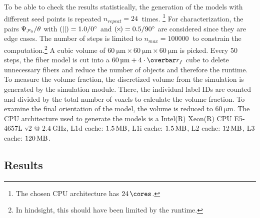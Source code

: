 %
To be able to check the results statistically, the generation of the models with different seed points is repeated  $n_{\mathit{repeat}} = \SI{24}{}$ times. \footnote{The chosen \ac{CPU} architecture has $\SI{24}{\cores}$.}
For characterization, the pairs $\textnormal{$\Psi_{\textnormal{$\mathcal{F}_0$}}$}/\textnormal{$\theta$}$ with $\textnormal{$(||)$} = \SI{1.0}{}/\SI{0}{\degree}$ and $\textnormal{$(\!\times\!)$}=\SI{0.5}{}/\SI{90}{\degree}$ are considered since they are edge cases.
The number of steps is limited to $n_{\mathit{max}}=\SI{100000}{}$ to constrain the computation.\footnote{In hindsight, this should have been limited by the runtime.}
A cubic volume of $\SI{60}{\micro\meter} \times \SI{60}{\micro\meter} \times \SI{60}{\micro\meter}$ is picked.
Every $\SI{50}{}$ steps, the fiber model is cut into a $\SI{60}{\micro\meter}+4 \cdot \fiberRadiusMean$ cube to delete unnecessary fibers and reduce the number of objects and therefore the runtime.
To measure the volume fraction, the discretized volume from the simulation is generated by the simulation module.
There, the individual label IDs are counted and divided by the total number of voxels to calculate the volume fraction.
To examine the final orientation of the model, the volume is reduced to $\SI{60}{\micro\meter}$.
The \ac{CPU} architecture used to generate the models is a
Intel(R) Xeon(R) CPU E5-4657L v2 @ $\SI{2.4}{\giga\hertz}$, L1d cache: $\SI{1.5}{\mega\byte}$, L1i cache: $\SI{1.5}{\mega\byte}$, L2 cache: $\SI{12}{\mega\byte}$, L3 cache: $\SI{120}{\mega\byte}$.
%
%
%
\subsection{Results} \label{sec:solverParameterResults}
%
